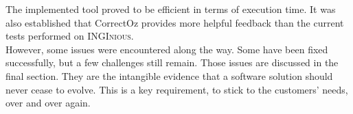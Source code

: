 \documentclass[11pt,a4paper,twoside,openright]{report}
\begin{document}
 The implemented tool proved to be efficient in terms of execution time. 
 It was also established that CorrectOz provides more helpful feedback than 
 the current tests performed on \textsc{INGInious}.\\




However, 
some issues were encountered along the way. Some have been fixed successfully, 
but a few challenges still remain. Those issues are discussed in the final 
section. They are the intangible evidence that a software solution should never 
cease to evolve. This is a key requirement, to stick to the customers' needs, 
over and over again.

% 
\end{document}
